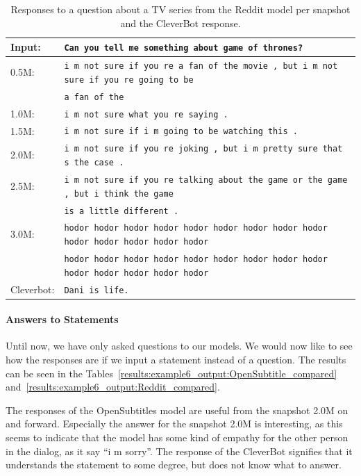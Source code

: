\begin{table}[H]
	\centering
	\begin{adjustbox}{max width=\textwidth}
		\begin{tabular}{ll}
			\toprule
			Input: 	& \texttt{Can you tell me something about game of thrones?}\\
			\midrule
			0.5M: 	& \texttt{i m not sure if you re a fan of the movie , but i m not sure if you re going to be}\\
			& \texttt{a fan of the}\\
			1.0M: 	& \texttt{i m not sure what you re saying .}\\
			1.5M:	& \texttt{i m not sure if i m going to be watching this .}\\
			2.0M:	& \texttt{i m not sure if you re joking , but i m pretty sure that s the case .}\\
			2.5M:	& \texttt{i m not sure if you re talking about the game or the game , but i think the game}\\
			& \texttt{is a little different .}\\
			3.0M:	& \texttt{hodor hodor hodor hodor hodor hodor hodor hodor hodor hodor hodor hodor hodor hodor }\\
			& \texttt{hodor hodor hodor hodor hodor hodor hodor hodor hodor hodor hodor hodor hodor hodor}\\
			Cleverbot:	& \texttt{Dani is life.}\\
			\bottomrule
		\end{tabular}
	\end{adjustbox}
	\caption{Responses to a question about a TV series from the Reddit model per snapshot and the CleverBot response.}
	\label{results:example5_output:Reddit_compared}
\end{table}

\paragraph{Answers to Statements}
Until now, we have only asked questions to our models. We would now like to see how the responses are if we input a statement instead of a question. The results can be seen in the Tables~\ref{results:example6_output:OpenSubtitle_compared} and~\ref{results:example6_output:Reddit_compared}.

The responses of the OpenSubtitles model are useful from the snapshot 2.0M on and forward. Especially the answer for the snapshot 2.0M is interesting, as this seems to indicate that the model has some kind of empathy for the other person in the dialog, as it say ``i m sorry''. The response of the CleverBot signifies that it understands the statement to some degree, but does not know what to answer.

